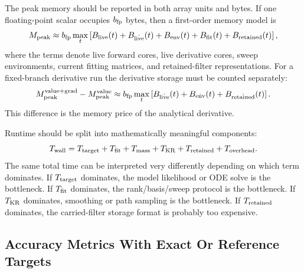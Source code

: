 \documentclass[11pt]{article}
\numberwithin{equation}{section}
\begin{document}
The peak memory should be reported in both array units and bytes.  If one
floating-point scalar occupies \(b_{\rm fp}\) bytes, then a first-order memory
model is
\begin{equation}
    M_{\rm peak}
    \approx
    b_{\rm fp}
    \max_t
    \left[
    B_{\rm live}(t)
    +B_{\dot{\rm live}}(t)
    +B_{\rm env}(t)
    +B_{\rm fit}(t)
    +B_{\rm retained}(t)
    \right],
    \label{eq:p27-v4}
\end{equation}
where the terms denote live forward cores, live derivative cores, sweep
environments, current fitting matrices, and retained-filter representations.
For a fixed-branch derivative run the derivative storage must be counted
separately:
\begin{equation}
    M_{\rm peak}^{\rm value+grad}
    -
    M_{\rm peak}^{\rm value}
    \approx
    b_{\rm fp}
    \max_t
    \left[
    B_{\dot{\rm live}}(t)+B_{\dot{\rm env}}(t)+B_{\dot{\rm retained}}(t)
    \right].
    \label{eq:p27-v5}
\end{equation}
This difference is the memory price of the analytical derivative.

Runtime should be split into mathematically meaningful components:
\begin{equation}
    T_{\rm wall}
    =
    T_{\rm target}
    +T_{\rm fit}
    +T_{\rm mass}
    +T_{\rm KR}
    +T_{\rm retained}
    +T_{\rm overhead}.
    \label{eq:p27-v6}
\end{equation}
The same total time can be interpreted very differently depending on which term
dominates.  If \(T_{\rm target}\) dominates, the model likelihood or ODE solve
is the bottleneck.  If \(T_{\rm fit}\) dominates, the rank/basis/sweep protocol
is the bottleneck.  If \(T_{\rm KR}\) dominates, smoothing or path sampling is
the bottleneck.  If \(T_{\rm retained}\) dominates, the carried-filter storage
format is probably too expensive.

\subsection{Accuracy Metrics With Exact Or Reference Targets}
\end{document}
